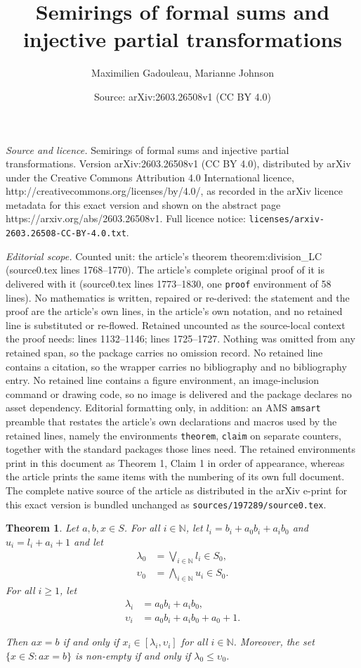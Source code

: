 \documentclass[10pt,a4paper]{amsart}
\title{Semirings of formal sums and injective partial transformations}
\author{Maximilien Gadouleau, Marianne Johnson}
\date{Source: arXiv:2603.26508v1 (CC BY 4.0)}
\newtheorem{theorem}{Theorem}
\newcommand{\N} {\mathbb{N}}
\newcommand{\bigjoin}   {\bigvee}
\newcommand{\bigmeet}   {\bigwedge}
\begin{document}
\maketitle

\noindent\emph{Source and licence.} Semirings of formal sums and injective partial transformations. Version arXiv:2603.26508v1 (CC BY 4.0), distributed by arXiv under the Creative Commons Attribution 4.0 International licence, http://creativecommons.org/licenses/by/4.0/, as recorded in the arXiv licence metadata for this exact version and shown on the abstract page https://arxiv.org/abs/2603.26508v1. Full licence notice: \texttt{licenses/arxiv-2603.26508-CC-BY-4.0.txt}.\par\smallskip

\noindent\textit{Editorial scope.} Counted unit: the article's theorem theorem:division\_LC (source0.tex lines 1768--1770). The article's complete original proof of it is delivered with it (source0.tex lines 1773--1830, one \texttt{proof} environment of 58 lines). No mathematics is written, repaired or re-derived: the statement and the proof are the article's own lines, in the article's own notation, and no retained line is substituted or re-flowed.  Retained uncounted as the source-local context the proof needs: lines 1132--1146; lines 1725--1727.  Nothing was omitted from any retained span, so the package carries no omission record.  No retained line contains a citation, so the wrapper carries no bibliography and no bibliography entry.  No retained line contains a figure environment, an image-inclusion command or drawing code, so no image is delivered and the package declares no asset dependency.  Editorial formatting only, in addition: an AMS \texttt{amsart} preamble that restates the article's own declarations and macros used by the retained lines, namely the environments \texttt{theorem}, \texttt{claim} on separate counters, together with the standard packages those lines need.  The retained environments print in this document as Theorem 1, Claim 1 in order of appearance, whereas the article prints the same items with the numbering of its own full document.  The complete native source of the article as distributed in the arXiv e-print for this exact version is bundled unchanged as \texttt{sources/197289/source0.tex}.
\begin{theorem} \label{theorem:ax=b}
Let $a, b, x \in S$. For all $i \in \N$, let $l_i = b_i + a_0 b_i + a_i b_0$ and $u_i = l_i + a_i + 1$ and let
\begin{align*}
    \lambda_0 &= \bigjoin_{i \in \N} l_i \in S_0, \\
    \upsilon_0 &= \bigmeet_{i \in \N} u_i \in S_0.
\end{align*}
For all $i \ge 1$, let
\begin{align*}
    \lambda_i &= a_0 b_i + a_i b_0, \\
    \upsilon_i &= a_0 b_i + a_i b_0 + a_0 + 1.
\end{align*}

Then $ax = b$ if and only if $x_i \in [ \lambda_i, \upsilon_i ]$ for all $i \in \N$. 
Moreover, the set $\{ x \in S: ax = b \}$ is non-empty if and only if $\lambda_0 \le \upsilon_0$.
\end{theorem}
\end{document}
